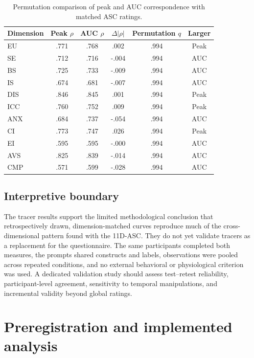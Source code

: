 \documentclass[pdflatex,sn-mathphys-num]{sn-jnl}
\begin{document}
\begin{table}[!htbp]
\centering
\small
\caption{Permutation comparison of peak and AUC correspondence with matched ASC ratings.}
\label{tab:supp_tracer_peak_auc}
\begin{tabular}{@{}lccccc@{}}
\toprule
Dimension & Peak $\rho$ & AUC $\rho$ & $\Delta|\rho|$ & Permutation $q$ & Larger \\
\midrule
EU  & .771 & .768 &  .002 & .994 & Peak \\
SE  & .712 & .716 & -.004 & .994 & AUC \\
BS  & .725 & .733 & -.009 & .994 & AUC \\
IS  & .674 & .681 & -.007 & .994 & AUC \\
DIS & .846 & .845 &  .001 & .994 & Peak \\
ICC & .760 & .752 &  .009 & .994 & Peak \\
ANX & .684 & .737 & -.054 & .994 & AUC \\
CI  & .773 & .747 &  .026 & .994 & Peak \\
EI  & .595 & .595 & -.000 & .994 & AUC \\
AVS & .825 & .839 & -.014 & .994 & AUC \\
CMP & .571 & .599 & -.028 & .994 & AUC \\
\bottomrule
\end{tabular}
\end{table}

\subsection{Interpretive boundary}

The tracer results support the limited methodological conclusion that retrospectively drawn, dimension-matched curves reproduce much of the cross-dimensional pattern found with the 11D-ASC. They do not yet validate tracers as a replacement for the questionnaire. The same participants completed both measures, the prompts shared constructs and labels, observations were pooled across repeated conditions, and no external behavioral or physiological criterion was used. A dedicated validation study should assess test--retest reliability, participant-level agreement, sensitivity to temporal manipulations, and incremental validity beyond global ratings.

\section{Preregistration and implemented analysis}
\end{document}
